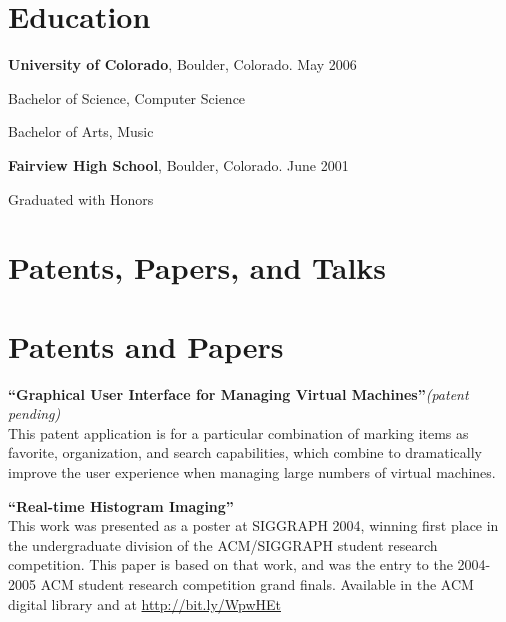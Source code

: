 \documentclass[margin,line]{resume}
\begin{document}
\begin{resume}
    \section{\mysidestyle Education}

    {\bf University of Colorado}, Boulder, Colorado. May 2006 \vspace{2mm}%
    \begin{list1}
    \item[] Bachelor of Science, Computer Science
    \item[] Bachelor of Arts, Music
    \end{list1}
    \ifcv
        {\bf Fairview High School}, Boulder, Colorado. June 2001 \vspace{2mm}%
        \begin{list1}
        \item[] Graduated with Honors
        \end{list1}
    \fi

    \ifcv
        \section{\mysidestyle Patents, Papers, and Talks}
    \else
        \section{\mysidestyle Patents and Papers}
    \fi

    {\bf``Graphical User Interface for Managing Virtual Machines''}{\it (patent pending)} \vspace{2mm}\\
    This patent application is for a particular combination of marking
    items as favorite, organization, and search capabilities, which combine
    to dramatically improve the user experience when managing large numbers
    of virtual machines.

    {\bf``Real-time Histogram Imaging''} \vspace{2mm}\\
    This work was presented as a poster at SIGGRAPH 2004, winning first place in
    the undergraduate division of the ACM/SIGGRAPH student research competition.
    This paper is based on that work, and was the entry to the 2004-2005 ACM
    student research competition grand finals. Available in the ACM digital
    library and at \href{http://bit.ly/WpwHEt}{http://bit.ly/WpwHEt}


\end{resume}
\end{document}
